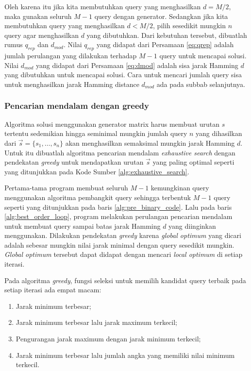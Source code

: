 Oleh karena itu jika kita membutuhkan query yang menghasilkan $d = M/2$, maka gunakan seluruh $M-1$ query dengan generator. Sedangkan jika kita membutuhkan query yang menghasilkan $d < M/2$, pilih sesedikit mungkin $n$ query agar menghasilkan $d$ yang dibutuhkan. Dari kebutuhan tersebut, dibuatlah rumus $q_{rep}$ dan $d_{mod}$. Nilai $q_{rep}$ yang didapat dari Persamaan \ref{eq:qrep} adalah jumlah perulangan yang dilakukan terhadap $M-1$ query untuk mencapai solusi. Nilai $d_{mod}$ yang didapat dari Persamaan \ref{eq:dmod} adalah sisa jarak Hamming $d$ yang dibutuhkan untuk mencapai solusi. Cara untuk mencari jumlah query sisa untuk menghasilkan jarak Hamming distance $d_{mod}$ ada pada subbab selanjutnya.


\subsubsection{Pencarian mendalam dengan greedy}

Algoritma solusi menggunakan generator matrix harus membuat urutan $s$ tertentu sedemikian hingga seminimal mungkin jumlah query $n$ yang dihasilkan dari $\vec{s} = \{s_1, \ldots, s_n\}$ akan menghasilkan semaksimal mungkin jarak Hamming $d$. Untuk itu dibuatlah algoritma pencarian mendalam \textit{exhaustive search} dengan pendekatan \textit{greedy} untuk mendapatkan urutan $\vec{s}$ yang paling optimal seperti yang ditunjukkan pada Kode Sumber \ref{alg:exhaustive_search}.

Pertama-tama program membuat seluruh $M-1$ kemungkinan query menggunakan algoritma pembangkit query sehingga terbentuk $M-1$ query seperti yang ditunjukkan pada baris \ref{alg:pre_binary_code}. Lalu pada baris \ref{alg:best_order_loop}, program melakukan perulangan pencarian mendalam untuk membuat query sampai batas jarak Hamming $d$ yang diinginkan menggunakan. Dilakukan pendekatan \textit{greedy} karena \textit{global optimum} yang dicari adalah sebesar mungkin nilai jarak minimal dengan query sesedikit mungkin. \textit{Global optimum} tersebut dapat didapat dengan mencari \textit{local optimum} di setiap iterasi.

Pada algoritma \textit{greedy}, fungsi seleksi untuk memilih kandidat query terbaik pada setiap iterasi ada empat macam:
\begin{enumerate}
  \item Jarak minimum terbesar;
  \item Jarak minimum terbesar lalu jarak maximum terkecil;
  \item Pengurangan jarak maximum dengan jarak minimum terkecil;
  \item Jarak minimum terbesar lalu jumlah angka yang memiliki nilai minimum terkecil.
\end{enumerate}

